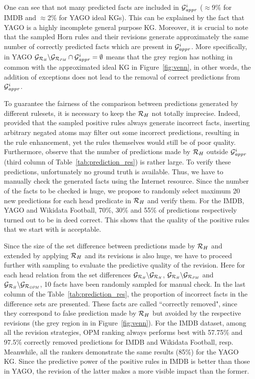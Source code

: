 One can see that not many predicted facts are included in $\mathcal{G}^i_{\mathit{appr}}$ ($\approx$9\% for IMDB and $\approx$2\% for YAGO ideal KGs). This can be explained by the fact that YAGO is a highly incomplete general purpose KG. Moreover, it is crucial to note that the sampled Horn rules and their revisions generate approximately the same number of correctly predicted facts which are present in $\mathcal{G}^i_{\mathit{appr}}$. More specifically, in YAGO $\mathcal{G}_{\mathit{\mathcal{R}_H}}\backslash \mathcal{G}_{\mathit{\mathcal{R}_{PM}}} \cap \mathcal{G}^i_{\mathit{appr}}=\emptyset$ means that the grey region has nothing in common with the approximated ideal KG in Figure~\ref{fig:venn}, in other words, the addition of exceptions does not lead to the removal of correct predictions from $\mathcal{G}^i_{\mathit{appr}}$.

To guarantee the fairness of the comparison between predictions generated by different rulesets, it is necessary to keep the $\mathcal{R}_H$ not totally imprecise. Indeed, provided that the sampled positive rules always generate incorrect facts, inserting arbitrary negated atoms may filter out some incorrect predictions, resulting in the rule enhancement, yet the rules themselves would still be of poor quality. Furthermore, observe that the number of predictions made by $\mathcal{R}_H$ outside $\mathcal{G}^i_{\mathit{appr}}$ (third column of Table~\ref{tab:prediction_res}) is rather large. To verify these predictions, unfortunately no ground truth is available. Thus, we have to manually check the generated facts using the Internet resource. Since the number of the facts to be checked is huge, we propose to randomly select maximum 20 new predictions for each head predicate in $\mathcal{R}_H$ and verify them. For the IMDB, YAGO and Wikidata Football, 70\%, 30\% and 55\% of predictions respectively turned out to be in deed correct. This shows that the quality of the positive rules that we start with is acceptable.

Since the size of the set difference between predictions made by $\mathcal{R}_H$ and extended by applying $\mathcal{R}_H$ and its revisions is also huge, we have to proceed further with sampling to evaluate the predictive quality of the revision. Here for each head relation from the set differences $\mathcal{G}_{\mathcal{R}_{\mathit{H}}}\backslash \mathcal{G}_{\mathcal{R}_{\mathit{N}}}$, $\mathcal{G}_{\mathcal{R}_{\mathit{H}}}\backslash \mathcal{G}_{\mathcal{R}_{\mathit{PM}}}$ and $\mathcal{G}_{\mathcal{R}_{\mathit{H}}}\backslash \mathcal{G}_{\mathcal{R}_{\mathit{OPM}}}$, 10 facts have been randomly sampled for manual check. In the last column of the Table~\ref{tab:prediction_res}, the proportion of incorrect facts in the difference sets are presented. These facts are called ``correctly removed", since they correspond to false prediction made by $\mathcal{R}_H$ but avoided by the respective revisions (the grey region in in Figure~\ref{fig:venn}). For the IMDB dataset, among all the revision strategies, OPM ranking always performs best with 57.75\% and 97.5\% correctly removed predictions for IMDB and Wikidata Football, resp. Meanwhile, all the rankers demonstrate the same results (85\%) for the YAGO KG. Since the predictive power of the positive rules in IMDB is better than those in YAGO, the revision of the latter makes a more visible impact than the former.

